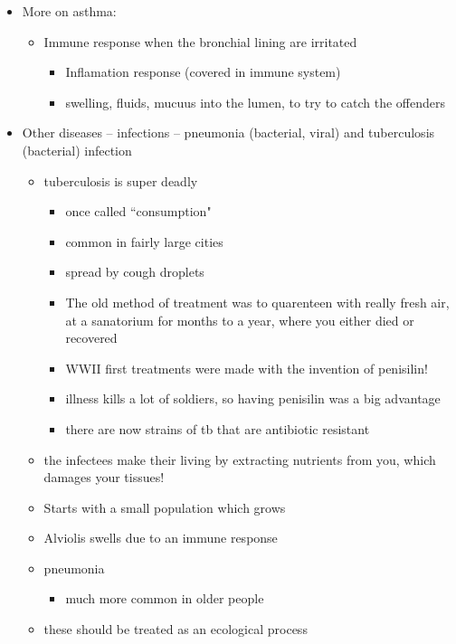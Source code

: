 \documentclass{article}
\theoremstyle{definition}
\begin{document}
\begin{itemize}
	\item More on asthma:
		\begin{itemize}
			\item Immune response when the bronchial lining are irritated
				\begin{itemize}
					\item Inflamation response (covered in immune system)
					\item swelling, fluids, mucuus into the lumen, to try to catch the offenders
				\end{itemize}
		\end{itemize}
	\item Other diseases -- infections -- pneumonia (bacterial, viral) and tuberculosis (bacterial) infection
		\begin{itemize}
			\item tuberculosis is super deadly
				\begin{itemize}
					\item once called ``consumption"
					\item common in fairly large cities
					\item spread by cough droplets
					\item The old method of treatment was to quarenteen with really fresh air, at a sanatorium for months to a year, where you either died or recovered
					\item WWII first treatments were made with the invention of penisilin!
					\item illness kills a lot of soldiers, so having penisilin was a big advantage
					\item there  are now strains of tb that are antibiotic resistant
				\end{itemize}
			\item the infectees make their living by extracting nutrients from you, which damages your tissues!
			\item Starts with a small population which grows
			\item  Alviolis swells due to an immune response
			\item pneumonia
				\begin{itemize}
					\item much more common in older people
				\end{itemize}
			\item these should be treated as an ecological process
				\begin{itemize}

\end{itemize}
\end{itemize}
\end{itemize}
\end{document}
